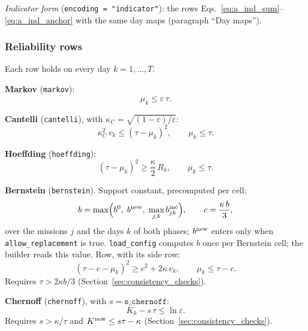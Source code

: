 \emph{Indicator form} (\texttt{encoding = "indicator"}): the rows
Eqs.~\eqref{eq:a_ind_sum}--\eqref{eq:a_ind_anchor} with the same day maps (paragraph
``Day maps'').

\subsubsection{Reliability rows}

Each row holds on every day $k = 1, \ldots, T$.

\textbf{Markov} (\texttt{markov}):
\begin{equation}
  \mu_k \leq \varepsilon\,\tau.
  \label{eq:rf_markov}
\end{equation}

\textbf{Cantelli} (\texttt{cantelli}), with $\kappa_C = \sqrt{(1-\varepsilon)/\varepsilon}$:
\begin{equation}
  \kappa_C^2\, v_k \leq (\tau - \mu_k)^2, \qquad \mu_k \leq \tau.
  \label{eq:rf_cantelli}
\end{equation}

\textbf{Hoeffding} (\texttt{hoeffding}):
\begin{equation}
  (\tau - \mu_k)^2 \geq \frac{\kappa}{2}\, R_k, \qquad \mu_k \leq \tau.
  \label{eq:rf_hoeffding}
\end{equation}

\textbf{Bernstein} (\texttt{bernstein}). Support constant, precomputed per cell:
\begin{equation}
  b = \max\Bigl(b^0,\; b^{\mathrm{new}},\; \max_{j,k} b^{\mathrm{inc}}_{jk}\Bigr), \qquad
  c = \frac{\kappa\, b}{3},
  \label{eq:rf_bsupport}
\end{equation}
over the missions $j$ and the days $k$ of both phases; $b^{\mathrm{new}}$ enters only when
\texttt{allow\_replacement} is true. \texttt{load\_config} computes $b$ once per Bernstein cell;
the builder reads this value. Row, with its side row:
\begin{equation}
  (\tau - c - \mu_k)^2 \geq c^2 + 2\kappa\, v_k, \qquad \mu_k \leq \tau - c.
  \label{eq:rf_bernstein}
\end{equation}
Requires $\tau > 2\kappa b/3$ (Section~\ref{sec:consistency_checks}).

\textbf{Chernoff} (\texttt{chernoff}), with $s = \texttt{s\_chernoff}$:
\begin{equation}
  K_k - s\,\tau \leq \ln\varepsilon.
  \label{eq:rf_chernoff}
\end{equation}
Requires $s > \kappa/\tau$ and $K^{\mathrm{new}} \leq s\tau - \kappa$
(Section~\ref{sec:consistency_checks}).

